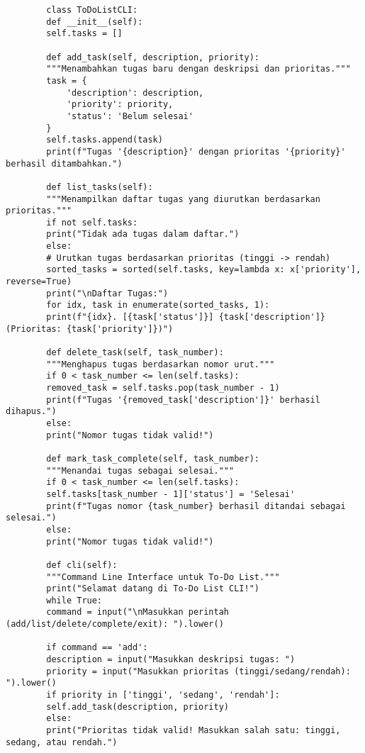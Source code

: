 \documentclass[12pt]{article}
\begin{document}
	
	\begin{lstlisting}
		class ToDoListCLI:
		def __init__(self):
		self.tasks = []
		
		def add_task(self, description, priority):
		"""Menambahkan tugas baru dengan deskripsi dan prioritas."""
		task = {
			'description': description,
			'priority': priority,
			'status': 'Belum selesai'
		}
		self.tasks.append(task)
		print(f"Tugas '{description}' dengan prioritas '{priority}' berhasil ditambahkan.")
		
		def list_tasks(self):
		"""Menampilkan daftar tugas yang diurutkan berdasarkan prioritas."""
		if not self.tasks:
		print("Tidak ada tugas dalam daftar.")
		else:
		# Urutkan tugas berdasarkan prioritas (tinggi -> rendah)
		sorted_tasks = sorted(self.tasks, key=lambda x: x['priority'], reverse=True)
		print("\nDaftar Tugas:")
		for idx, task in enumerate(sorted_tasks, 1):
		print(f"{idx}. [{task['status']}] {task['description']} (Prioritas: {task['priority']})")
		
		def delete_task(self, task_number):
		"""Menghapus tugas berdasarkan nomor urut."""
		if 0 < task_number <= len(self.tasks):
		removed_task = self.tasks.pop(task_number - 1)
		print(f"Tugas '{removed_task['description']}' berhasil dihapus.")
		else:
		print("Nomor tugas tidak valid!")
		
		def mark_task_complete(self, task_number):
		"""Menandai tugas sebagai selesai."""
		if 0 < task_number <= len(self.tasks):
		self.tasks[task_number - 1]['status'] = 'Selesai'
		print(f"Tugas nomor {task_number} berhasil ditandai sebagai selesai.")
		else:
		print("Nomor tugas tidak valid!")
		
		def cli(self):
		"""Command Line Interface untuk To-Do List."""
		print("Selamat datang di To-Do List CLI!")
		while True:
		command = input("\nMasukkan perintah (add/list/delete/complete/exit): ").lower()
		
		if command == 'add':
		description = input("Masukkan deskripsi tugas: ")
		priority = input("Masukkan prioritas (tinggi/sedang/rendah): ").lower()
		if priority in ['tinggi', 'sedang', 'rendah']:
		self.add_task(description, priority)
		else:
		print("Prioritas tidak valid! Masukkan salah satu: tinggi, sedang, atau rendah.")
		

\end{lstlisting}
\end{document}
